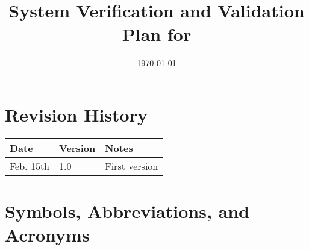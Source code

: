 \documentclass[12pt, titlepage]{article}
\begin{document}
\title{System Verification and Validation Plan for \progname{}} 
\author{\authname}
\date{\today}
	
\maketitle


\section*{Revision History}

\begin{tabularx}{\textwidth}{p{3cm}p{2cm}X}
\toprule {\bf Date} & {\bf Version} & {\bf Notes}\\
\midrule
Feb. 15th & 1.0 & First version\\
\bottomrule
\end{tabularx}



\newpage

\tableofcontents



\newpage

\section{Symbols, Abbreviations, and Acronyms}
\end{document}
